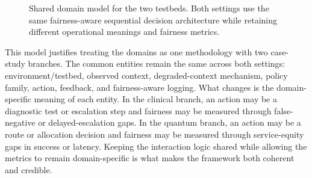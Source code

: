 \documentclass{IEEEtran}
\begin{document}
\begin{figure}[!t]
\centering
{}
\caption{Shared domain model for the two testbeds. Both settings use the same fairness-aware sequential decision architecture while retaining different operational meanings and fairness metrics.}
\label{fig:domain_model}
\end{figure}

This model justifies treating the domains as one methodology with two case-study branches. The common entities remain the same across both settings: environment/testbed, observed context, degraded-context mechanism, policy family, action, feedback, and fairness-aware logging. What changes is the domain-specific meaning of each entity. In the clinical branch, an action may be a diagnostic test or escalation step and fairness may be measured through false-negative or delayed-escalation gaps. In the quantum branch, an action may be a route or allocation decision and fairness may be measured through service-equity gaps in success or latency. Keeping the interaction logic shared while allowing the metrics to remain domain-specific is what makes the framework both coherent and credible.
\end{document}
